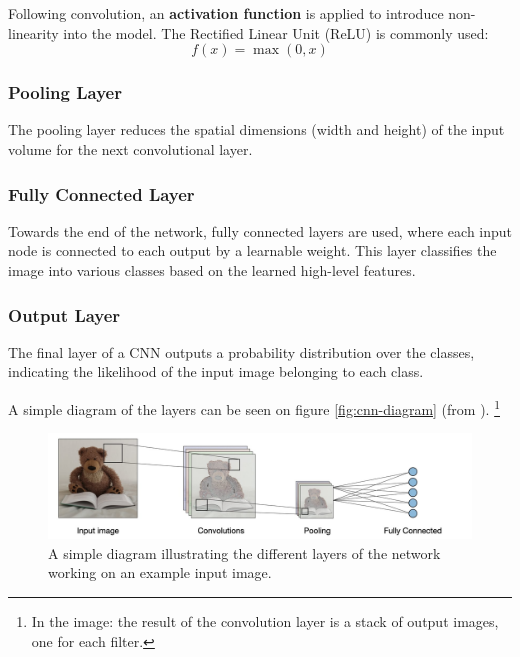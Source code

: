 Following convolution, an \textbf{activation function} is applied to introduce non-linearity into the model. The Rectified Linear Unit (ReLU) \label{relu} is commonly used:
\[f(x) = \max(0, x)\]

\subsubsection{Pooling Layer}
The pooling layer reduces the spatial dimensions (width and height) of the input volume for the next convolutional layer.

\subsubsection{Fully Connected Layer}
Towards the end of the network, fully connected layers are used, where each input node is connected to each output by a learnable weight. This layer classifies the image into various classes based on the learned high-level features.

\subsubsection{Output Layer}
The final layer of a CNN
outputs a probability distribution over the classes, indicating the likelihood of the input image belonging to each class.

A simple diagram of the layers can be seen on figure \autoref{fig:cnn-diagram} (from \cite{cnn_diagram_source}). \footnote{In the image: the result of the convolution layer is a stack of output images, one for each filter.}

\begin{figure}[h!]
	\centering
	\includegraphics[width=0.5\linewidth]{"pictures/architecture-cnn-en.jpeg"}
	\caption{A simple diagram illustrating the different layers of the network working on an example input image.}
	\label{fig:cnn-diagram}

\end{figure}

